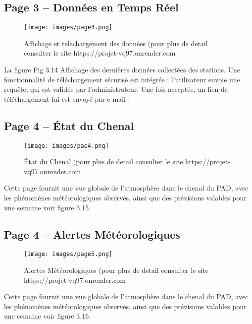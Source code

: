 \documentclass[a4paper,12pt,openany]{report}
\begin{document}
 \subsection{Page 3 – Données en Temps Réel}
\begin{figure}[H]
	\begin{center}
		\begin{minipage}{\textwidth}
			\begin{center}
				\texttt{[image: images/page3.png]}
			\end{center}
		\end{minipage}
		\caption{Affichage et telechargement des données  (pour plus de detail consulter le site https://projet-vq97.onrender.com}
	\end{center}
\end{figure}
La figure Fig 3.14 Affichage des dernières données collectées des stations. Une fonctionnalité de téléchargement sécurisé est intégrée : l’utilisateur envoie une requête, qui est validée par l’administrateur. Une fois acceptée, un lien de téléchargement lui est envoyé par e-mail .


\subsection{Page 4 – État du Chenal}
\begin{figure}[H]
	\begin{center}
		\begin{minipage}{\textwidth}
			\begin{center}
				\texttt{[image: images/pae4.png]}
			\end{center}
		\end{minipage}
		\caption{État du Chenal (pour plus de detail consulter le site https://projet-vq97.onrender.com}
	\end{center}
\end{figure}
 Cette page fournit une vue globale de l’atmosphère dans le chenal du PAD, avec les phénomènes météorologiques observés, ainsi que des prévisions valables pour une semaine voir figure   3.15.
 
 \subsection{Page 4 – Alertes Météorologiques}
 \begin{figure}[H]
 	\begin{center}
 		\begin{minipage}{\textwidth}
 			\begin{center}
 				\texttt{[image: images/page5.png]}
 			\end{center}
 		\end{minipage}
 		\caption{Alertes Météorologiques (pour plus de detail consulter le site  https://projet-vq97.onrender.com}
 	\end{center}
 \end{figure}
 Cette page fournit une vue globale de l’atmosphère dans le chenal du PAD, avec les phénomènes météorologiques observés, ainsi que des prévisions valables pour une semaine voir figure  3.16.
 
\end{document}
